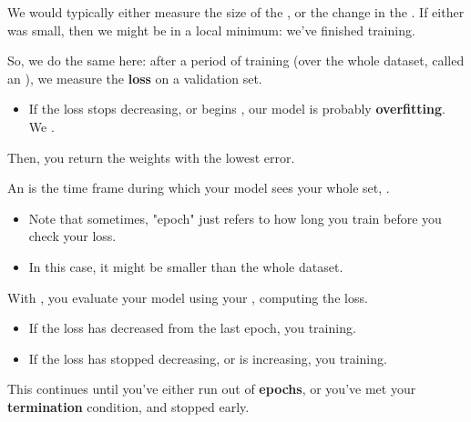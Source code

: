             We would typically either measure the size of the , or the change in the . If either was small, then we might be in a local minimum: we've finished training.

            \phantom{}

            So, we do the same here: after a period of training (over the whole dataset, called an ), we measure the \textbf{loss} on a validation set.

            \begin{itemize}
                \item If the loss stops decreasing, or begins , our model is probably \textbf{overfitting}. We .
            \end{itemize}

            Then, you return the weights with the lowest error.\\

            \begin{definition}
                An  is the time frame during which your model sees your whole  set, .

                \begin{itemize}
                    \item Note that sometimes, "epoch" just refers to how long you train before you check your loss.
                    \item In this case, it might be smaller than the whole dataset.
                \end{itemize}
            \end{definition}

            \phantom{}

            \begin{definition}
                With , you evaluate your model using your , computing the loss.

                \begin{itemize}
                    \item If the loss has decreased from the last epoch, you  training.
                    \item If the loss has stopped decreasing, or is increasing, you  training.
                \end{itemize}

                This continues until you've either run out of \textbf{epochs}, or you've met your \textbf{termination} condition, and stopped early.
            \end{definition}


